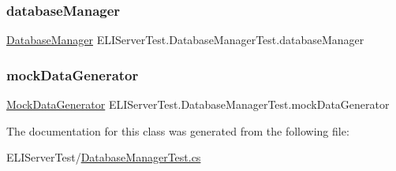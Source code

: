 \subsubsection{\texorpdfstring{database\+Manager}{databaseManager}}
{\footnotesize\ttfamily \hyperlink{class_e_l_i_server_1_1_database_manager}{Database\+Manager} E\+L\+I\+Server\+Test.\+Database\+Manager\+Test.\+database\+Manager\hspace{0.3cm}{\ttfamily [private]}}

\mbox{\label{class_e_l_i_server_test_1_1_database_manager_test_a0141dc942df4a6b86491010e34c15877}} 
\subsubsection{\texorpdfstring{mock\+Data\+Generator}{mockDataGenerator}}
{\footnotesize\ttfamily \hyperlink{class_e_l_i_server_test_1_1_mock_data_generator}{Mock\+Data\+Generator} E\+L\+I\+Server\+Test.\+Database\+Manager\+Test.\+mock\+Data\+Generator\hspace{0.3cm}{\ttfamily [private]}}



The documentation for this class was generated from the following file\+:\begin{DoxyCompactItemize}
\item 
E\+L\+I\+Server\+Test/\hyperlink{_database_manager_test_8cs}{Database\+Manager\+Test.\+cs}\end{DoxyCompactItemize}

